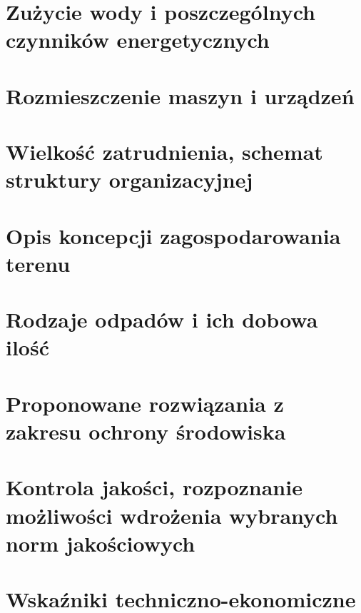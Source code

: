 \documentclass{article}
\begin{document}
\section{Zużycie wody i poszczególnych czynników energetycznych}

\section{Rozmieszczenie maszyn i urządzeń}

\section{Wielkość zatrudnienia, schemat struktury organizacyjnej}

\section{Opis koncepcji zagospodarowania terenu}

\section{Rodzaje odpadów i ich dobowa ilość}

\section{Proponowane rozwiązania z zakresu ochrony środowiska}

\section{Kontrola jakości, rozpoznanie możliwości wdrożenia wybranych norm jakościowych}

\section{Wskaźniki techniczno-ekonomiczne}

\newpage
\renewcommand*{\bibfont}{\small}
\printbibliography
\end{document}
